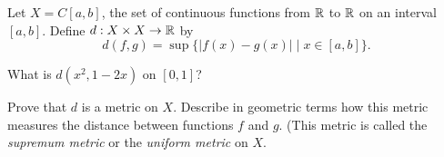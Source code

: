 \begin{comment}
\item We prove this statement to be true. Let $x = \inf(A)$ and $y = \inf(B)$, and assume without loss of generality that $x \leq y$. Let $w \in A \cup B$. Then $w \in A$ or $w \in B$. If $w \in A$ then $w \geq x$ and if $w \in B$ then $w \geq y \geq x$.  So $x$ is a lower bound for $A \cup B$. Thus, $A \cup B$ has an infimum. Let $z = \inf(A \cup B)$. Since $z$ is the greatest lower bound of $A \cup B$, it follows that $z \geq x$. To prove that $z = x$, proceed by contradiction and assume that $z > x$. Then Exercise \ref{ex:GLB_between} shows that there is an element $a \in A$ such that $x \leq a < z$. But $a \in A \cup B$ and so we must have $z \leq a$, a contradiction. We conclude that $z = x$. 

\ea

\end{comment}

\item \label{ex:GLB_function_sup_metric} Let $X = C[a,b]$, the set of continuous functions from $\mathbb{R}$ to $\mathbb{R}$ on an interval $[a,b]$. Define $d: X \times X \to \mathbb{R}$ by \[d(f,g) = \sup\{|f(x)-g(x)| \mid x \in [a,b]\}.\]


\ba
\item What is $d(x^2,1-2x)$ on $[0,1]$? 

\item Prove that $d$ is a metric on $X$. Describe in geometric terms how this metric measures the distance between functions $f$ and $g$. (This metric is called the \emph{supremum metric} or the \emph{uniform metric} on $X$.  

\ea


